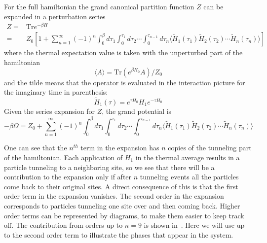 \documentclass[oneside,11pt]{memoir}
\begin{document}
For the full hamiltonian the grand canonical partition function $Z$ can be
expanded in a perturbation series~\cite{Henderson1992} 
\begin{equation}
\begin{split}
  Z = & \text{Tr} e^{-\beta H}  \\
    = & Z_{0} \left[ 1 + 
        \sum_{n=1}^{\infty} (-1)^{n} 
        \int_{0}^{\beta} d\tau_{1} \int_{0}^{\tau_{1}} d\tau_{2} 
        \dotsm \int_{0}^{\tau_{n-1}} d\tau_{n} 
        \langle
              \tilde{H}_{1}(\tau_{1}) 
              \tilde{H}_{2}(\tau_{2})  \dotsm
              \tilde{H}_{n}(\tau_{n})  \rangle 
              \right] 
\end{split}
\end{equation} 
where the thermal expectation value is taken with the
unperturbed part of the hamiltonian
\begin{equation}
\langle A \rangle = \text{Tr} ( e^{\beta H_{0} } A ) / Z_{0} 
\end{equation}
and the tilde means that the operator is evaluated in the interaction picture
for the imaginary time in parenthesis: 
\begin{equation}
 \tilde{H}_{1}(\tau) = e^{\tau H_{0}} H_{1} e^{-\tau H_{0}} 
\end{equation}
Given the series expansion for $Z$, the grand potential is 
\begin{equation}
 -\beta \Omega = Z_{0} + 
        \sum_{n=1}^{\infty} (-1)^{n} 
        \int_{0}^{\beta} d\tau_{1} \int_{0}^{\tau_{1}} d\tau_{2} 
        \dotsm \int_{0}^{\tau_{n-1}} d\tau_{n} 
        \langle
              \tilde{H}_{1}(\tau_{1}) 
              \tilde{H}_{2}(\tau_{2})  \dotsm
              \tilde{H}_{n}(\tau_{n})  \rangle 
\end{equation}

One can see that the $n^{th}$ term in the expansion has $n$ copies of the
tunneling part of the hamiltonian.  Each  application of $H_{1}$ in the thermal
average results in a particle tunneling to a neighboring site, so we see that
there will be a contribution to the expansion only if after $n$ tunneling
events all the particles come back to their original sites.  A direct
consequence of this is that the first order term in the expansion vanishes.
The second order in the expansion corresponds to particles tunneling one site
over and then coming back.  Higher order terms can be represented by diagrams,
to make them easier to keep track off.  The contribution from orders up to
$n=9$ is shown in~\cite{Henderson1992}.  Here we will use up to the second
order term to illustrate the phases that appear in the system.  
\end{document}
